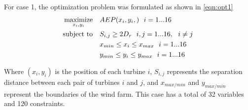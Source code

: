 \documentclass[a4paper]{jpconf}
\begin{document}
For case 1, the optimization problem was formulated as shown in \cref{eqn:opt1}
%
\begin{equation}
	\label{eqn:opt1}
	\begin{aligned} [b]
	\underset{x_i,y_i}{\textrm{maximize}} \quad & AEP(x_i,y_i,)~~i=1...16\\
	\textrm{subject to} \quad & S_{i,j} \geq 2\*D_{r}~~i,j=1...16,~~i \neq j\\
	 & x_{min} \leq x_i \leq x_{max}~~i=1...16\\
     & y_{min} \leq y_i \leq y_{max}~~i=1...16\\
	\end{aligned}
\end{equation}
%
Where $(x_i,y_i)$ is the position of each turbine $i$, $S_{i,j}$ represents the separation distance between each pair of turbines $i$ and $j$, and $x_{max/min}$ and $y_{max/min}$ represent the boundaries of the wind farm. This case has a total of 32 variables and 120 constraints.
\end{document}
